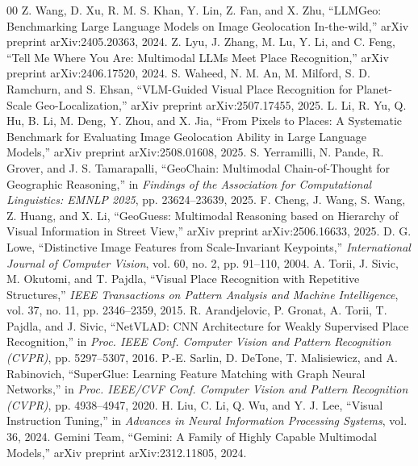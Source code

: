\documentclass[10pt,conference]{IEEEtran}
\begin{document}
\begin{thebibliography}{00}
 Z. Wang, D. Xu, R. M. S. Khan, Y. Lin, Z. Fan, and X. Zhu, ``LLMGeo: Benchmarking Large Language Models on Image Geolocation In-the-wild,'' arXiv preprint arXiv:2405.20363, 2024.
 Z. Lyu, J. Zhang, M. Lu, Y. Li, and C. Feng, ``Tell Me Where You Are: Multimodal LLMs Meet Place Recognition,'' arXiv preprint arXiv:2406.17520, 2024.
 S. Waheed, N. M. An, M. Milford, S. D. Ramchurn, and S. Ehsan, ``VLM-Guided Visual Place Recognition for Planet-Scale Geo-Localization,'' arXiv preprint arXiv:2507.17455, 2025.
 L. Li, R. Yu, Q. Hu, B. Li, M. Deng, Y. Zhou, and X. Jia, ``From Pixels to Places: A Systematic Benchmark for Evaluating Image Geolocation Ability in Large Language Models,'' arXiv preprint arXiv:2508.01608, 2025.
 S. Yerramilli, N. Pande, R. Grover, and J. S. Tamarapalli, ``GeoChain: Multimodal Chain-of-Thought for Geographic Reasoning,'' in \textit{Findings of the Association for Computational Linguistics: EMNLP 2025}, pp. 23624--23639, 2025.
 F. Cheng, J. Wang, S. Wang, Z. Huang, and X. Li, ``GeoGuess: Multimodal Reasoning based on Hierarchy of Visual Information in Street View,'' arXiv preprint arXiv:2506.16633, 2025.
 D. G. Lowe, ``Distinctive Image Features from Scale-Invariant Keypoints,'' \textit{International Journal of Computer Vision}, vol. 60, no. 2, pp. 91--110, 2004.
 A. Torii, J. Sivic, M. Okutomi, and T. Pajdla, ``Visual Place Recognition with Repetitive Structures,'' \textit{IEEE Transactions on Pattern Analysis and Machine Intelligence}, vol. 37, no. 11, pp. 2346--2359, 2015.
 R. Arandjelovic, P. Gronat, A. Torii, T. Pajdla, and J. Sivic, ``NetVLAD: CNN Architecture for Weakly Supervised Place Recognition,'' in \textit{Proc. IEEE Conf. Computer Vision and Pattern Recognition (CVPR)}, pp. 5297--5307, 2016.
 P.-E. Sarlin, D. DeTone, T. Malisiewicz, and A. Rabinovich, ``SuperGlue: Learning Feature Matching with Graph Neural Networks,'' in \textit{Proc. IEEE/CVF Conf. Computer Vision and Pattern Recognition (CVPR)}, pp. 4938--4947, 2020.
 H. Liu, C. Li, Q. Wu, and Y. J. Lee, ``Visual Instruction Tuning,'' in \textit{Advances in Neural Information Processing Systems}, vol. 36, 2024.
 Gemini Team, ``Gemini: A Family of Highly Capable Multimodal Models,'' arXiv preprint arXiv:2312.11805, 2024.
\end{thebibliography}
\end{document}
